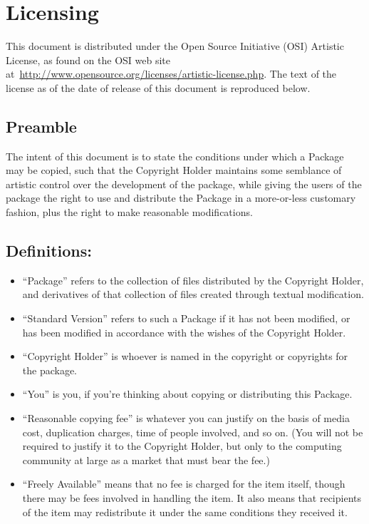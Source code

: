 
\chapter{Licensing}
\label{cha:licensing}


This document is distributed under the Open Source Initiative (OSI)
Artistic License, as found on the OSI web site at\ 
\url{http://www.opensource.org/licenses/artistic-license.php}.  The
text of the license as of the date of release of this document is
reproduced below.


\section*{Preamble}
\label{sec:preamble}



The intent of this document is to state the conditions under which a
Package may be copied, such that the Copyright Holder maintains some
semblance of artistic control over the development of the package,
while giving the users of the package the right to use and distribute
the Package in a more-or-less customary fashion, plus the right to
make reasonable modifications.


\section*{Definitions:}
\label{sec:definitions}


\begin{itemize}
\item ``Package'' refers to the collection of files distributed by the
  Copyright Holder, and derivatives of that collection of files
  created through textual modification.
\item ``Standard Version'' refers to such a Package if it has not been
  modified, or has been modified in accordance with the wishes of the
  Copyright Holder.
\item ``Copyright Holder'' is whoever is named in the copyright or
  copyrights for the package.
\item ``You'' is you, if you're thinking about copying or distributing
  this Package.
\item ``Reasonable copying fee'' is whatever you can justify on the
  basis of media cost, duplication charges, time of people involved,
  and so on. (You will not be required to justify it to the Copyright
  Holder, but only to the computing community at large as a market
  that must bear the fee.)
\item ``Freely Available'' means that no fee is charged for the item
  itself, though there may be fees involved in handling the item. It
  also means that recipients of the item may redistribute it under the
  same conditions they received it.
\end{itemize}


